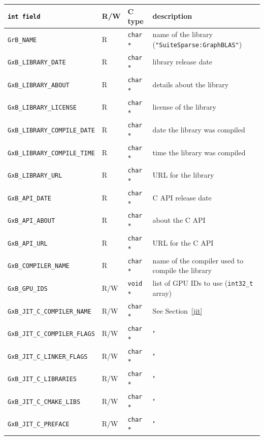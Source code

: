 \vspace{0.1in}
\noindent
{\small
\begin{tabular}{|l|l|l|p{2.5in}|}
\hline
\verb'int field'                    & R/W  & C type        & description \\
\hline
\verb'GrB_NAME'                     & R    & \verb'char *' & name of the library \newline
                                                                (\verb'"SuiteSparse:GraphBLAS"') \\
\verb'GxB_LIBRARY_DATE'             & R    & \verb'char *' & library release date \\
\verb'GxB_LIBRARY_ABOUT'            & R    & \verb'char *' & details about the library \\
\verb'GxB_LIBRARY_LICENSE'          & R    & \verb'char *' & license of the library \\
\verb'GxB_LIBRARY_COMPILE_DATE'     & R    & \verb'char *' & date the library was compiled \\
\verb'GxB_LIBRARY_COMPILE_TIME'     & R    & \verb'char *' & time the library was compiled \\
\verb'GxB_LIBRARY_URL'              & R    & \verb'char *' & URL for the library \\
\verb'GxB_API_DATE'                 & R    & \verb'char *' & C API release date \\
\verb'GxB_API_ABOUT'                & R    & \verb'char *' & about the C API \\
\verb'GxB_API_URL'                  & R    & \verb'char *' & URL for the C API \\
\verb'GxB_COMPILER_NAME'            & R    & \verb'char *' & name of the compiler used to compile the library \\
\hline
\verb'GxB_GPU_IDS'                  & R/W  & \verb'void *'& list of GPU IDs to use (\verb'int32_t' array)\\
\hline
\verb'GxB_JIT_C_COMPILER_NAME'      & R/W  & \verb'char *' & See Section~\ref{jit} \\
\verb'GxB_JIT_C_COMPILER_FLAGS'     & R/W  & \verb'char *' & " \\
\verb'GxB_JIT_C_LINKER_FLAGS'       & R/W  & \verb'char *' & " \\
\verb'GxB_JIT_C_LIBRARIES'          & R/W  & \verb'char *' & " \\
\verb'GxB_JIT_C_CMAKE_LIBS'         & R/W  & \verb'char *' & " \\
\verb'GxB_JIT_C_PREFACE'            & R/W  & \verb'char *' & " \\

\end{tabular}}
